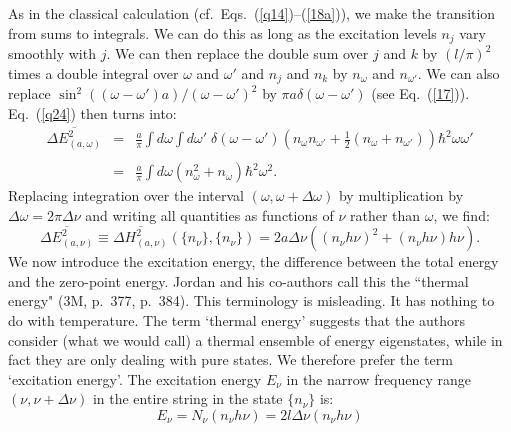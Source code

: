 \documentclass[12pt]{elsart}
\begin{document}
As in the classical calculation (cf.\ Eqs.\ (\ref{q14})--(\ref{18a})), we  make the transition from sums to integrals. We can do this as long as the excitation levels $n_j$ vary smoothly with $j$. We can then replace the double sum over $j$ and $k$ by $(l/\pi)^2$ times a double integral over $\omega$ and $\omega'$ and $n_j$ and $n_k$ by $n_\omega$ and $n_{\omega'}$. We can also replace $\sin^2{((\omega - \omega')a)}/(\omega - \omega')^2$ by $\pi a \delta(\omega - \omega')$ (see Eq.\ (\ref{17})). Eq.\ (\ref{q24}) then turns into:
\begin{eqnarray}
\overline{\Delta E_{(a, \omega)}^2}
& = &
\frac{a}{\pi} \int d\omega \int d\omega' \; \delta(\omega - \omega')
 \left(  n_\omega n_{\omega'} + \frac{1}{2} \left( n_\omega  + n_{\omega'} \right) \right) \hbar^2 \omega \omega'  \nonumber \\
 & & \label{q21a} \\
 & = & \frac{a}{\pi} \int d\omega \left(  n_\omega^2 + n_\omega  \right) \hbar^2 \omega^2.  \nonumber
 \end{eqnarray}
Replacing integration over the interval $(\omega, \omega + \Delta \omega)$ by multiplication by $\Delta \omega = 2 \pi \Delta \nu$ and writing all quantities as functions of $\nu$ rather than $\omega$, we find:
\begin{equation}
\overline{\Delta E_{(a, \nu)}^2}  \equiv \overline{\Delta H_{(a, \nu)}^2}(\{ n_\nu \}, \{ n_\nu \}) = 2a \Delta \nu \left( (n_\nu h \nu)^2 +  (n_\nu h \nu) h \nu \right).
 \label{q21b}
\end{equation}
We now introduce the 
excitation energy, the difference between the total energy and the zero-point energy. Jordan and his co-authors call this  the ``thermal energy"  (3M, p.\ 377, p.\ 384). This terminology is misleading. It has nothing to do with temperature. The term `thermal energy' suggests  that the authors consider (what we would call) a thermal ensemble of energy eigenstates, while in fact they are only dealing with pure states. We therefore prefer the term `excitation energy'. The excitation energy $E_\nu$ in the narrow frequency range $(\nu, \nu + \Delta \nu)$ in the entire string in the state $\{ n_\nu \}$ is:
\begin{equation}
E_\nu = N_\nu (n_\nu  h \nu)  = 2 l \Delta \nu (n_\nu h \nu)
\end{equation}
\end{document}
